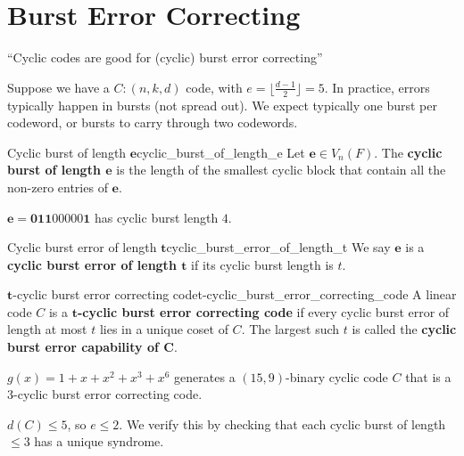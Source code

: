 \section{Burst Error Correcting}
``Cyclic codes are good for (cyclic) burst error correcting''

Suppose we have a $ C:(n,k,d) $ code, with $ e=\lfloor \frac{d-1}{2} \rfloor=5 $.
In practice, errors typically happen in bursts (not spread out).
We expect typically one burst per codeword, or bursts to carry through
two codewords.

\begin{Definition}{Cyclic burst of length $\symbf{e}$}{cyclic_burst_of_length_e}
    Let $ \symbf{e}\in V_n(F) $. The \textbf{cyclic burst of length $\symbf{e}$}
    is the length of the smallest cyclic block that contain all the non-zero
    entries of $ \symbf{e} $.
\end{Definition}

\begin{Example}{}{}
    $ \symbf{e}=\symbf{011}00000\symbf{1} $ has cyclic burst length $ 4 $.
\end{Example}

\begin{Definition}{Cyclic burst error of length $ \symbf{t} $}{cyclic_burst_error_of_length_t}
    We say $ \symbf{e} $ is a \textbf{cyclic burst error of length $ \symbf{t} $} if its cyclic
    burst length is $ t $.
\end{Definition}

\begin{Definition}{$ \symbf{t} $-cyclic burst error correcting code}{t-cyclic_burst_error_correcting_code}
    A linear code $ C $ is a \textbf{$ \symbf{t} $-cyclic burst error correcting code}
    if every cyclic burst error of length at most $ t $ lies in a unique coset
    of $ C $. The largest such $ t $ is called the \textbf{cyclic burst error capability
        of $ \symbf{C} $}.
\end{Definition}

\begin{Example}{}{}
    $ g(x)=1+x+x^2+x^3+x^6 $ generates a $ (15,9) $-binary cyclic code $ C $
    that is a $ 3 $-cyclic burst error correcting code.
\end{Example}

$ d(C)\leqslant 5 $, so $ e\leqslant 2 $. We verify this by checking that
each cyclic burst of length $ \leqslant 3 $ has a unique syndrome.

